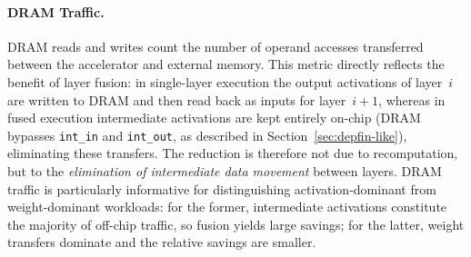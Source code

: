 \paragraph{DRAM Traffic.}
DRAM reads and writes count the number of operand accesses transferred
between the accelerator and external memory.
This metric directly reflects the benefit of layer fusion:
in single-layer execution the output activations of layer~$i$ are
written to DRAM and then read back as inputs for layer~$i+1$,
whereas in fused execution intermediate activations are kept
entirely on-chip (DRAM bypasses \texttt{int\_in} and
\texttt{int\_out}, as described in
Section~\ref{sec:depfin-like}), eliminating these transfers.
The reduction is therefore not due to recomputation, but to the
\emph{elimination of intermediate data movement} between layers.
DRAM traffic is particularly informative for distinguishing
activation-dominant from weight-dominant workloads: for the former,
intermediate activations constitute the majority of off-chip traffic,
so fusion yields large savings; for the latter, weight transfers
dominate and the relative savings are smaller.
